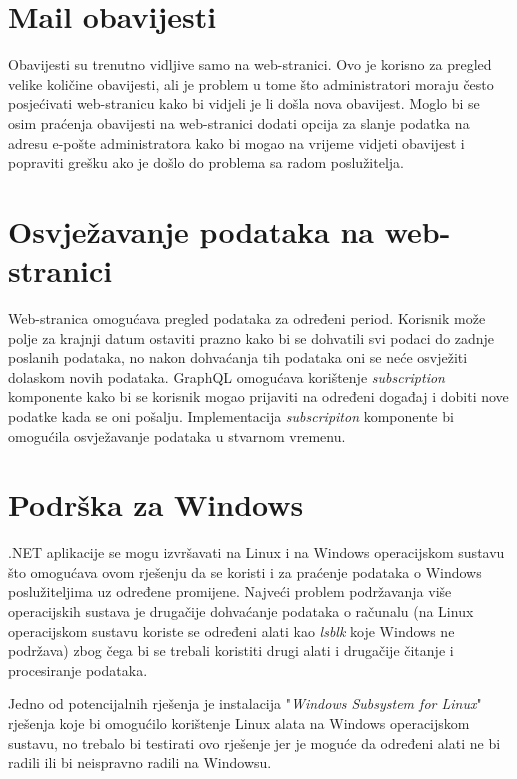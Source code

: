 \documentclass[zavrsnirad]{fer}
\begin{document}
\section{Mail obavijesti}
Obavijesti su trenutno vidljive samo na web-stranici. Ovo je korisno za pregled velike količine obavijesti, ali je problem u tome što administratori moraju često posjećivati web-stranicu kako bi vidjeli je li došla nova obavijest. Moglo bi se osim praćenja obavijesti na web-stranici dodati opcija za slanje podatka na adresu e-pošte administratora kako bi mogao na vrijeme vidjeti obavijest i popraviti grešku ako je došlo do problema sa radom poslužitelja.

\section{Osvježavanje podataka na web-stranici}
Web-stranica omogućava pregled podataka za određeni period. Korisnik može polje za krajnji datum ostaviti prazno kako bi se dohvatili svi podaci do zadnje poslanih podataka, no nakon dohvaćanja tih podataka oni se neće osvježiti dolaskom novih podataka. GraphQL omogućava korištenje \textit{subscription} komponente kako bi se korisnik mogao prijaviti na određeni događaj i dobiti nove podatke kada se oni pošalju. Implementacija \textit{subscripiton} komponente bi omogućila osvježavanje podataka u stvarnom vremenu.

\section{Podrška za Windows}
.NET aplikacije se mogu izvršavati na Linux i na Windows operacijskom sustavu što omogućava ovom rješenju da se koristi i za praćenje podataka o Windows poslužiteljima uz određene promijene. Najveći problem podržavanja više operacijskih sustava je drugačije dohvaćanje podataka o računalu (na Linux operacijskom sustavu koriste se određeni alati kao \textit{lsblk} koje Windows ne podržava) zbog čega bi se trebali koristiti drugi alati i drugačije čitanje i procesiranje podataka.

Jedno od potencijalnih rješenja je instalacija "\textit{Windows Subsystem for Linux}" rješenja koje bi omogućilo korištenje Linux alata na Windows operacijskom sustavu, no trebalo bi testirati ovo rješenje jer je moguće da određeni alati ne bi radili ili bi neispravno radili na Windowsu.

\end{document}

